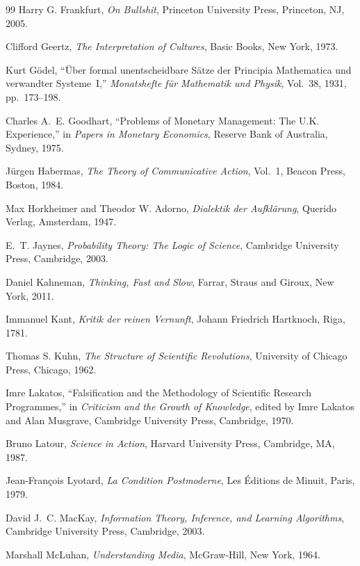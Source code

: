 \documentclass[12pt, openright, twoside]{book}
\begin{document}
\begin{thebibliography}{99}
Harry G. Frankfurt,
\textit{On Bullshit},
Princeton University Press, Princeton, NJ, 2005.

Clifford Geertz,
\textit{The Interpretation of Cultures},
Basic Books, New York, 1973.

Kurt G\"odel,
``\"Uber formal unentscheidbare S\"atze der Principia Mathematica und
verwandter Systeme~I,''
\textit{Monatshefte f\"ur Mathematik und Physik},
Vol.~38, 1931, pp.~173--198.

Charles A.~E. Goodhart,
``Problems of Monetary Management: The U.K. Experience,''
in \textit{Papers in Monetary Economics},
Reserve Bank of Australia, Sydney, 1975.

J\"urgen Habermas,
\textit{The Theory of Communicative Action}, Vol.~1,
Beacon Press, Boston, 1984.

Max Horkheimer and Theodor W. Adorno,
\textit{Dialektik der Aufkl\"arung},
Querido Verlag, Amsterdam, 1947.

E.~T. Jaynes,
\textit{Probability Theory: The Logic of Science},
Cambridge University Press, Cambridge, 2003.

Daniel Kahneman,
\textit{Thinking, Fast and Slow},
Farrar, Straus and Giroux, New York, 2011.

Immanuel Kant,
\textit{Kritik der reinen Vernunft},
Johann Friedrich Hartknoch, Riga, 1781.

Thomas S. Kuhn,
\textit{The Structure of Scientific Revolutions},
University of Chicago Press, Chicago, 1962.

Imre Lakatos,
``Falsification and the Methodology of Scientific Research Programmes,''
in \textit{Criticism and the Growth of Knowledge},
edited by Imre Lakatos and Alan Musgrave,
Cambridge University Press, Cambridge, 1970.

Bruno Latour,
\textit{Science in Action},
Harvard University Press, Cambridge, MA, 1987.

Jean-Fran\c{c}ois Lyotard,
\textit{La Condition Postmoderne},
Les \'Editions de Minuit, Paris, 1979.

David J.~C. MacKay,
\textit{Information Theory, Inference, and Learning Algorithms},
Cambridge University Press, Cambridge, 2003.

Marshall McLuhan,
\textit{Understanding Media},
McGraw-Hill, New York, 1964.


\end{thebibliography}
\end{document}
